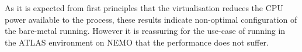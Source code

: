 As it is expected from first principles that the virtualisation
reduces the CPU power available to the process, these results indicate
non-optimal configuration of the bare-metal running. However it is
reassuring for the use-case of running in the ATLAS environment on
NEMO that the performance does not suffer.



%
%

